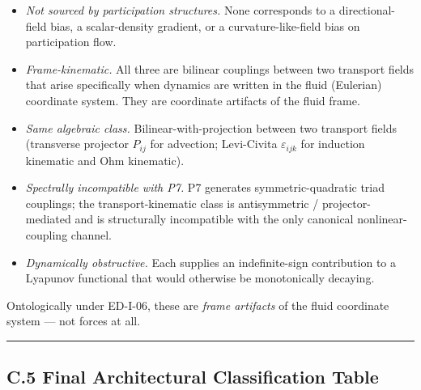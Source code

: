 \documentclass[
]{article}
\providecommand{\tightlist}{%
  \setlength{\itemsep}{0pt}\setlength{\parskip}{0pt}}
\begin{document}
\begin{itemize}
\tightlist
\item
  \emph{Not sourced by participation structures.} None corresponds to a
  directional-field bias, a scalar-density gradient, or a
  curvature-like-field bias on participation flow.
\item
  \emph{Frame-kinematic.} All three are bilinear couplings between two
  transport fields that arise specifically when dynamics are written in
  the fluid (Eulerian) coordinate system. They are coordinate artifacts
  of the fluid frame.
\item
  \emph{Same algebraic class.} Bilinear-with-projection between two
  transport fields (transverse projector \(P_{ij}\) for advection;
  Levi-Civita \(\varepsilon_{ijk}\) for induction kinematic and Ohm
  kinematic).
\item
  \emph{Spectrally incompatible with P7.} P7 generates
  symmetric-quadratic triad couplings; the transport-kinematic class is
  antisymmetric / projector-mediated and is structurally incompatible
  with the only canonical nonlinear-coupling channel.
\item
  \emph{Dynamically obstructive.} Each supplies an indefinite-sign
  contribution to a Lyapunov functional that would otherwise be
  monotonically decaying.
\end{itemize}

Ontologically under ED-I-06, these are \emph{frame artifacts} of the
fluid coordinate system --- not forces at all.

\begin{center}\rule{0.5\linewidth}{0.5pt}\end{center}

\subsection{C.5 Final Architectural Classification
Table}\label{c.5-final-architectural-classification-table}
\end{document}
